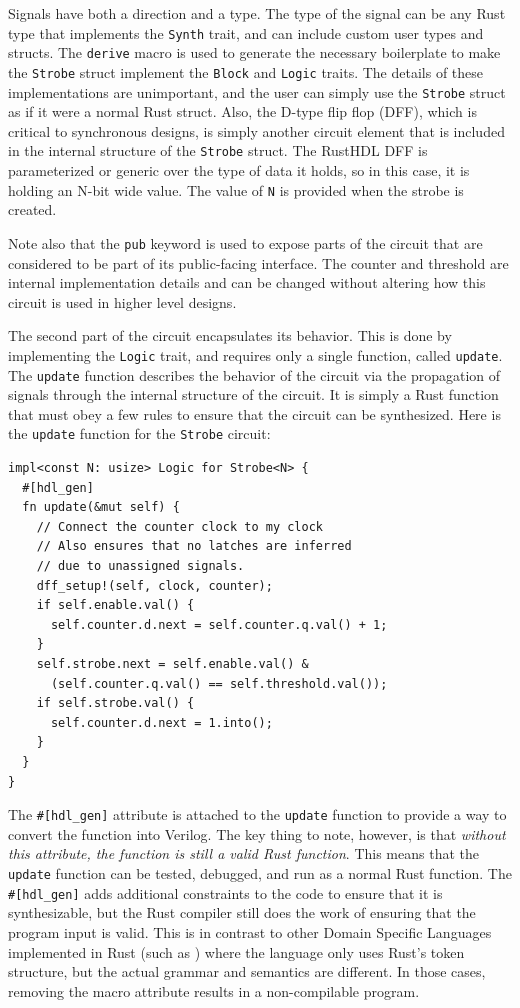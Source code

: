 \documentclass[conference]{IEEEtran}
\begin{document}
Signals have both a direction and a type.  The type of the
signal can be any Rust type that implements the \verb|Synth| trait, and can include custom user
types and structs.  The \verb|derive| macro is used to generate the necessary boilerplate to make the 
\verb|Strobe| struct implement the \verb|Block| and \verb|Logic| traits.  The details of these implementations are
unimportant, and the user can simply use the \verb|Strobe| struct as if it were a normal Rust struct.  Also,
the D-type flip flop (DFF), which is critical to synchronous designs, is simply another circuit element that
is included in the internal structure of the \verb|Strobe| struct.  The RustHDL DFF is parameterized or 
generic over the type of data it holds, so in this case, it is holding an N-bit wide value.  The value of
\verb|N| is provided when the strobe is created.

Note also that the \verb|pub| keyword is used to expose parts of the circuit that are considered to be part
of its public-facing interface.   The counter and threshold are internal implementation details and can be
changed without altering how this circuit is used in higher level designs.

The second part of the circuit encapsulates its behavior.  This is done by implementing the \verb|Logic| trait,
and requires only a single function, called \verb|update|.  The \verb|update| function describes the behavior
of the circuit via the propagation of signals through the internal structure of the circuit.  It is simply a Rust function
that must obey a few rules to ensure that the circuit can be synthesized.  Here is the \verb|update| function for
the \verb|Strobe| circuit:

\begin{verbatim}
impl<const N: usize> Logic for Strobe<N> {
  #[hdl_gen]
  fn update(&mut self) {
    // Connect the counter clock to my clock
    // Also ensures that no latches are inferred
    // due to unassigned signals.
    dff_setup!(self, clock, counter);
    if self.enable.val() {
      self.counter.d.next = self.counter.q.val() + 1;
    }
    self.strobe.next = self.enable.val() & 
      (self.counter.q.val() == self.threshold.val());
    if self.strobe.val() {
      self.counter.d.next = 1.into();
    }
  }
}
\end{verbatim}

The \verb|#[hdl_gen]| attribute is attached to the \verb|update| function to provide a way to convert the function
into Verilog.  The key thing to note, however, is that \emph{without this attribute, the function is still a valid Rust function}.
This means that the \verb|update| function can be tested, debugged, and run as a normal Rust function.  The \verb|#[hdl_gen]| adds
additional constraints to the code to ensure that it is synthesizable, but the Rust compiler still does the work of ensuring that the 
program input is valid.  This is in contrast to other Domain Specific Languages implemented in Rust (such as \cite{b10}) where the 
language only uses Rust's token structure, but the actual grammar and semantics are different.  In those cases, removing the 
macro attribute results in a non-compilable program.
\end{document}
